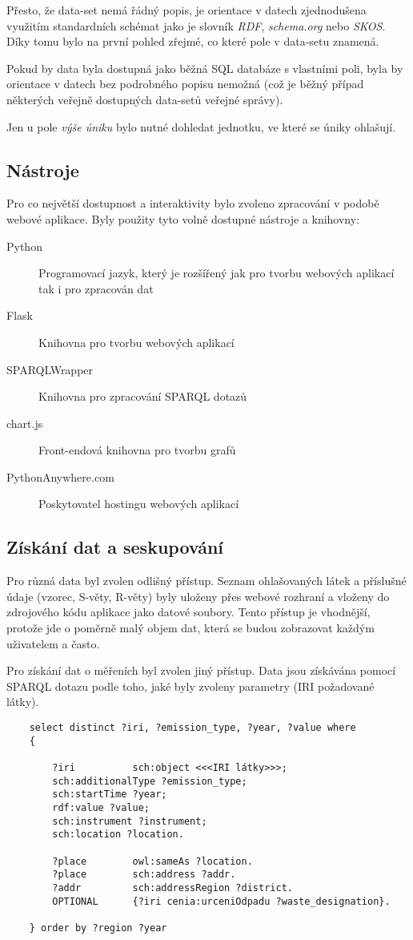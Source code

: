 \documentclass[12pt]{article}
\begin{document}
Přesto, že data-set nemá řádný popis, je orientace v datech zjednodušena využitím standardních schémat jako je slovník \emph{RDF}, \emph{schema.org} nebo \emph{SKOS}. Díky tomu bylo na první pohled zřejmé, co které pole v data-setu znamená.

Pokud by data byla dostupná jako běžná SQL databáze s vlastními poli, byla by orientace v datech bez podrobného popisu nemožná (což je běžný případ některých veřejně dostupných data-setů veřejné správy).

Jen u pole \emph{výše úniku} bylo nutné dohledat jednotku, ve které se úniky ohlašují.


\subsection*{Nástroje}
Pro co největší dostupnost a interaktivity bylo zvoleno zpracování v podobě webové aplikace. Byly použity tyto volně dostupné nástroje a knihovny:

	\begin{description}
		\item[Python] Programovací jazyk, který je rozšířený jak pro tvorbu webových aplikací tak i pro zpracován dat
		\item[Flask] Knihovna pro tvorbu webových aplikací
		\item[SPARQLWrapper] Knihovna pro zpracování SPARQL dotazů
		\item[chart.js] Front-endová knihovna pro tvorbu grafů
		\item[PythonAnywhere.com] Poskytovatel hostingu webových aplikací
	\end{description}


\subsection*{Získání dat a seskupování}
Pro různá data byl zvolen odlišný přístup. Seznam ohlašovaných látek a příslušné údaje (vzorec, S-věty, R-věty) byly uloženy přes webové rozhraní a vloženy do zdrojového kódu aplikace jako datové soubory. Tento přístup je vhodnější, protože jde o poměrně malý objem dat, která se budou zobrazovat každým uživatelem a často.

Pro získání dat o měřeních byl zvolen jiný přístup. Data jsou získávána pomocí SPARQL dotazu podle toho, jaké byly zvoleny parametry (IRI požadované látky).

	\begin{verbatim}
	select distinct ?iri, ?emission_type, ?year, ?value where
	{
	
		?iri          sch:object <<<IRI látky>>>;
		sch:additionalType ?emission_type;
		sch:startTime ?year;
		rdf:value ?value;
		sch:instrument ?instrument;
		sch:location ?location.
		
		?place        owl:sameAs ?location.
		?place        sch:address ?addr.
		?addr         sch:addressRegion ?district.
		OPTIONAL      {?iri cenia:urceniOdpadu ?waste_designation}.
	
	} order by ?region ?year
	\end{verbatim}
\end{document}

